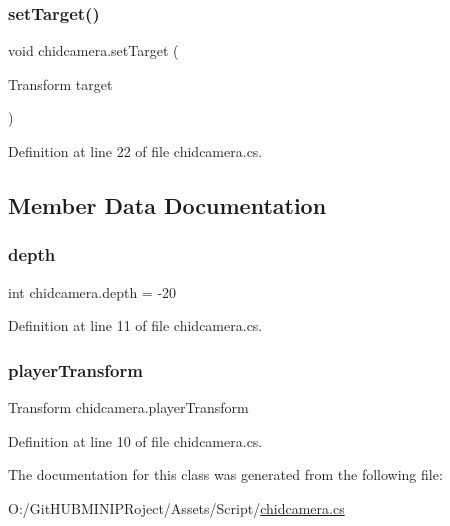 \subsubsection{\texorpdfstring{setTarget()}{setTarget()}}
{\footnotesize\ttfamily void chidcamera.\+set\+Target (\begin{DoxyParamCaption}\item[{Transform}]{target }\end{DoxyParamCaption})}



Definition at line 22 of file chidcamera.\+cs.



\subsection{Member Data Documentation}
\mbox{\label{classchidcamera_abf48941307b13b49b9a0aafefb36cd5c}} 
\subsubsection{\texorpdfstring{depth}{depth}}
{\footnotesize\ttfamily int chidcamera.\+depth = -\/20}



Definition at line 11 of file chidcamera.\+cs.

\mbox{\label{classchidcamera_a8adbef10036b8431e2601b5b895392cf}} 
\subsubsection{\texorpdfstring{playerTransform}{playerTransform}}
{\footnotesize\ttfamily Transform chidcamera.\+player\+Transform}



Definition at line 10 of file chidcamera.\+cs.



The documentation for this class was generated from the following file\+:\begin{DoxyCompactItemize}
\item 
O\+:/\+Git\+H\+U\+B\+M\+I\+N\+I\+P\+Roject/\+Assets/\+Script/\mbox{\hyperlink{chidcamera_8cs}{chidcamera.\+cs}}\end{DoxyCompactItemize}
